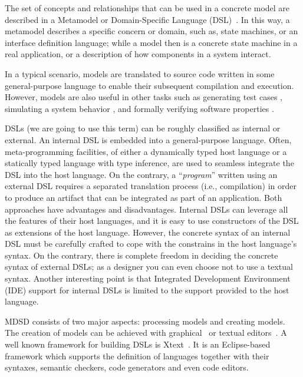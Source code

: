The set of concepts and relationships that can be used in a concrete model are described in a Metamodel or Domain-Specific Language (DSL)~\cite{Fowler:2010:DSL:1809745}.
In this way, a metamodel describes a specific concern or domain, such as, state machines, or an interface definition language; while a model then is a concrete state machine in a real application, or a description of how components in a system interact.
 
In a typical scenario, models are translated to source code written in some general-purpose language to enable their subsequent compilation and execution.
However, models are also useful in other tasks such as generating test cases \cite{Kiffe2009,Gutierrez2015}, simulating a system behavior \cite{Broenink2012,brosig2015a,Bocciarelli2015425}, and formally verifying software properties \cite{Holzmann2004,Henriksson2005101,Moffett2013,DiGuglielmo20132013}. 

DSLs (we are going to use this term) can be roughly classified as internal or external.
An internal DSL is embedded into a general-purpose language.
Often, meta-programming facilities, of either a dynamically typed host language or a statically typed language with type inference, are used to seamless integrate the DSL into the host language.
On the contrary, a ``\textit{program}'' written using an external DSL requires a separated translation process (i.e., compilation) in order to produce an artifact that can be integrated as part of an application.
Both approaches have advantages and disadvantages.
Internal DSLs can leverage all the features of their host languages, and it is easy to use constructors of the DSL as extensions of the host language.
However, the concrete syntax of an internal DSL must be carefully crafted to cope with the constrains in the host language's syntax.
On the contrary, there is complete freedom in deciding the concrete syntax of external DSLs; as a designer you can even choose not to use a textual syntax.
Another interesting point is that Integrated Development Environment (IDE) support for internal DSLs is limited to the support provided to the host language.

MDSD consists of two major aspects: processing models and creating models.
The creation of models can be achieved with graphical~\cite{Kolovos:2009:RLA:1564600.1564699, Biermann:2006:GDI:2087202.2087244} or textual editors~\cite{Merkle:2010:TMT:1869542.1869564}.
A well known framework for building DSLs is Xtext~\cite{Eysholdt:2010:XIY:1869542.1869625}.
It is an Eclipse-based framework which supports the definition of languages together with their syntaxes, semantic checkers, code generators and even code editors.

